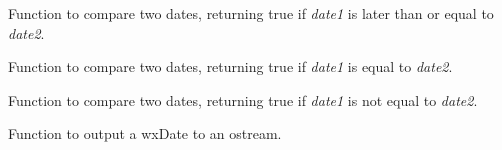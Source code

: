 
Function to compare two dates, returning true if {\it date1} is later than or equal to {\it date2}.

\label{wxdateequals}


Function to compare two dates, returning true if {\it date1} is equal to {\it date2}.

\label{wxdatenotequals}


Function to compare two dates, returning true if {\it date1} is not equal to {\it date2}.

\label{wxdateinsert}


Function to output a wxDate to an ostream.


